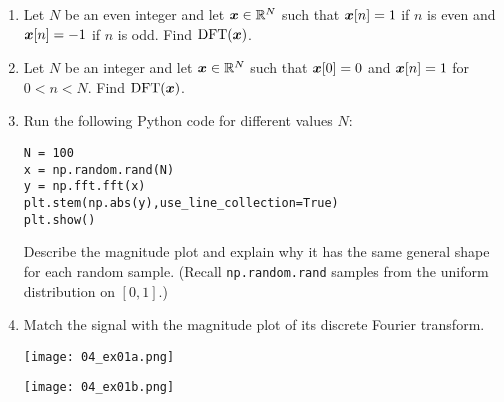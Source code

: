 \begin{enumerate}[leftmargin=*]
\item Let $N$ be an even integer and let $\boldsymbol{x} \in \mathbb{R}^N$ such that $\boldsymbol{x}[n] = 1$ if $n$ is even and $\boldsymbol{x}[n] = -1$ if $n$ is odd. Find $\mathrm{DFT}(\boldsymbol{x})$.
\item Let $N$ be an integer and let $\boldsymbol{x} \in \mathbb{R}^N$ such that $\boldsymbol{x}[0] = 0$ and $\boldsymbol{x}[n] = 1$ for $0<n<N$. Find $\mathrm{DFT}(\boldsymbol{x})$.
\item Run the following Python code for different values $N$:
\begin{verbatim}
N = 100
x = np.random.rand(N)
y = np.fft.fft(x)
plt.stem(np.abs(y),use_line_collection=True)
plt.show()
\end{verbatim}
Describe the magnitude plot and explain why it has the same general shape for each random sample. (Recall {\tt np.random.rand} samples from the uniform distribution on $[0,1]$.)
\newpage
\item Match the signal with the magnitude plot of its discrete Fourier transform.
\begin{center}
\texttt{[image: 04\_ex01a.png]}
\end{center}
\begin{center}
\texttt{[image: 04\_ex01b.png]}
\end{center}
\end{enumerate}